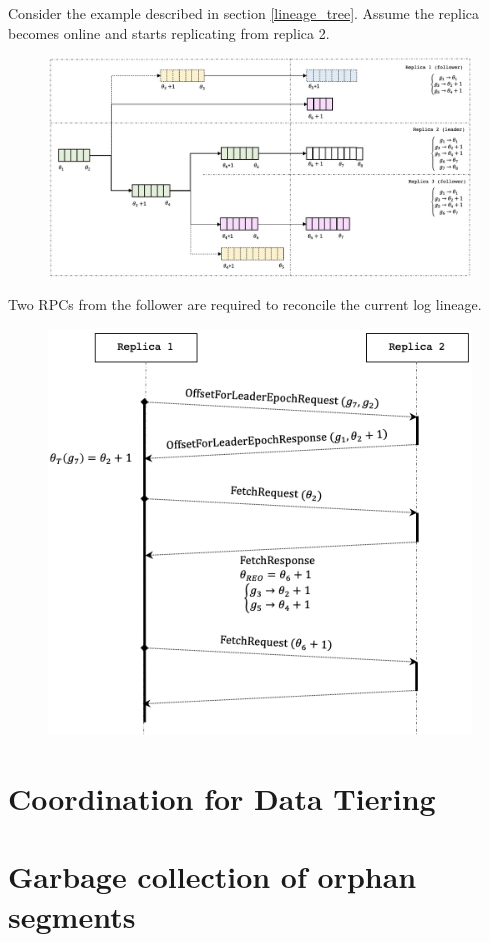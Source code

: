 \documentclass{article}
\begin{document}
Consider the example described in section \ref{lineage_tree}. Assume the replica becomes online and starts replicating from replica 2.

\begin{figure}[H]
	\centering
	\includegraphics[scale=0.45]{lineage-tree-2.png}
	\label{fig:lineage-tree-2}
\end{figure}

Two RPCs from the follower are required to reconcile the current log lineage.

\begin{figure}[H]
	\centering
	\includegraphics[scale=0.5]{RPCs.png}
	\label{fig:rpc}
\end{figure}


\newpage
\section{Coordination for Data Tiering}

\newpage
\section{Garbage collection of orphan segments}

\newpage

{}
\end{document}

